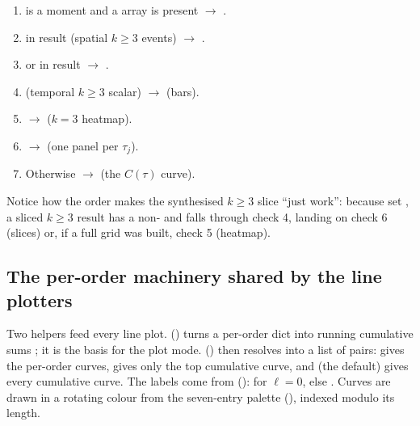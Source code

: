 \begin{enumerate}
  \item {} is a moment and a  array is present
        $\to$ .
  \item {} in result (spatial $k\ge 3$ events) $\to$
        .
  \item {} or  in result $\to$
        .
  \item {} (temporal $k\ge 3$ scalar) $\to$
         (bars).
  \item {} $\to$
         ($k=3$ heatmap).
  \item {} $\to$
         (one panel per $\tau_j$).
  \item Otherwise $\to$  (the $C(\tau)$ curve).
\end{enumerate}

Notice how the order makes the synthesised $k\ge 3$ slice ``just work'': because
 set , a sliced $k\ge 3$ result has a
non-  and falls through check 4, landing on check 6
(slices) or, if a full grid was built, check 5 (heatmap).

\subsection{The per-order machinery shared by the line plotters}

Two helpers feed every line plot. 
() turns a per-order dict 
into running cumulative sums ; it is the basis
for the  plot mode. 
() then resolves  into a
list of  pairs:  gives the per-order
curves,  gives only the top cumulative curve, and
 (the default) gives every cumulative curve. The labels come
from  (): 
for $\ell=0$, else . Curves are drawn in a rotating
colour from the seven-entry palette 
(), indexed modulo its length.

